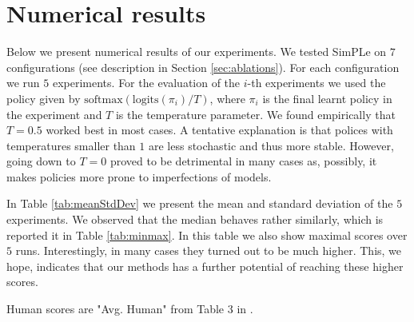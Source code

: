 \clearpage
\appendix

\onecolumn
\section{Numerical results}\label{numerical_results}
Below we present numerical results of our experiments. We tested SimPLe on $7$ configurations (see description in Section \ref{sec:ablations}). For each configuration we run $5$ experiments. For the evaluation of the $i$-th experiments we used the policy given by $\text{softmax}(\text{logits}(\pi_i)/T)$, where  $\pi_i$ is the final learnt policy in the experiment and $T$ is the temperature parameter. We found empirically that $T=0.5$ worked best in most cases. A tentative explanation is that polices with temperatures smaller than $1$ are less stochastic and thus more stable. However, going down to $T=0$ proved to be detrimental in many cases as, possibly, it makes policies more prone to imperfections of models.

In Table \ref{tab:meanStdDev} we present the mean and standard deviation of the $5$ experiments. We observed that the median behaves rather similarly, which is reported it in Table \ref{tab:minmax}. In this table we also show maximal scores over $5$ runs. Interestingly, in many cases they turned out to be much higher. This, we hope, indicates that our methods has a further potential of reaching these higher scores.

Human scores are "Avg. Human" from Table 3 in \cite{Pohlenetal2018}.

\newenvironment{changemargin}[2]{%
\begin{list}{}{%
\setlength{\topsep}{0pt}%
\setlength{\leftmargin}{#1}%
\setlength{\rightmargin}{#2}%
\setlength{\listparindent}{\parindent}%
\setlength{\itemindent}{\parindent}%
\setlength{\parsep}{\parskip}%
}%
\item[]}{\end{list}}

